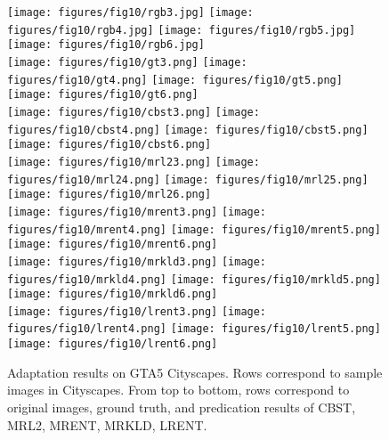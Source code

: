 \documentclass[10pt,twocolumn,letterpaper]{article}
\theoremstyle{plain}
\begin{document}
\begin{figure*}[!t]
	\vspace{1mm}
	\texttt{[image: figures/fig10/rgb3.jpg]}
	\texttt{[image: figures/fig10/rgb4.jpg]}
	\texttt{[image: figures/fig10/rgb5.jpg]}
	\texttt{[image: figures/fig10/rgb6.jpg]}
	\quad\\\vspace{0.5mm}
	\texttt{[image: figures/fig10/gt3.png]}
	\texttt{[image: figures/fig10/gt4.png]}
	\texttt{[image: figures/fig10/gt5.png]}
	\texttt{[image: figures/fig10/gt6.png]}
	\quad\\\vspace{0.5mm}
	\texttt{[image: figures/fig10/cbst3.png]}
	\texttt{[image: figures/fig10/cbst4.png]}
	\texttt{[image: figures/fig10/cbst5.png]}
	\texttt{[image: figures/fig10/cbst6.png]}
	\quad\\\vspace{0.5mm}
	\texttt{[image: figures/fig10/mrl23.png]}
	\texttt{[image: figures/fig10/mrl24.png]}
	\texttt{[image: figures/fig10/mrl25.png]}
	\texttt{[image: figures/fig10/mrl26.png]}
	\quad\\\vspace{0.5mm}
	\texttt{[image: figures/fig10/mrent3.png]}
	\texttt{[image: figures/fig10/mrent4.png]}
	\texttt{[image: figures/fig10/mrent5.png]}
	\texttt{[image: figures/fig10/mrent6.png]}
	\quad\\\vspace{0.5mm}
	\texttt{[image: figures/fig10/mrkld3.png]}
	\texttt{[image: figures/fig10/mrkld4.png]}
	\texttt{[image: figures/fig10/mrkld5.png]}
	\texttt{[image: figures/fig10/mrkld6.png]}
	\quad\\\vspace{0.5mm}
	\texttt{[image: figures/fig10/lrent3.png]}
	\texttt{[image: figures/fig10/lrent4.png]}
	\texttt{[image: figures/fig10/lrent5.png]}
	\texttt{[image: figures/fig10/lrent6.png]}
	\caption{Adaptation results on GTA5  Cityscapes. Rows correspond to sample images in Cityscapes. From top to bottom, rows correspond to original images, ground truth, and predication results of CBST, MRL2, MRENT, MRKLD, LRENT.}
	\label{fig:gta2city}
\end{figure*}
\end{document}
